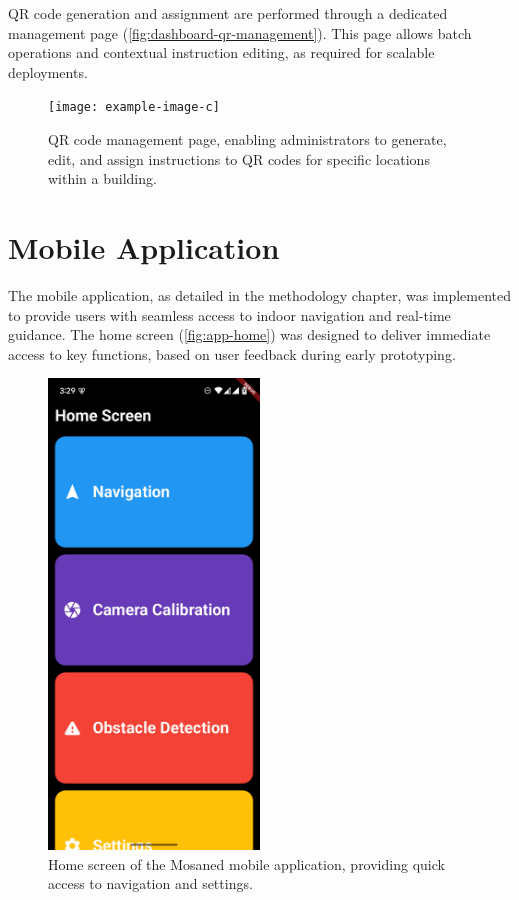 QR code generation and assignment are performed through a dedicated management page (\autoref{fig:dashboard-qr-management}). This page allows batch operations and contextual instruction editing, as required for scalable deployments.
\begin{figure}[h]
	\centering
	\texttt{[image: example-image-c]}
	\caption{QR code management page, enabling administrators to generate, edit, and assign instructions to QR codes for specific locations within a building.}
	\label{fig:dashboard-qr-management}
\end{figure}

\section{Mobile Application}

The mobile application, as detailed in the methodology chapter, was implemented to provide users with seamless access to indoor navigation and real-time guidance. The home screen (\autoref{fig:app-home}) was designed to deliver immediate access to key functions, based on user feedback during early prototyping.
\begin{figure}[h]
	\centering
	\includegraphics[width=0.5\textwidth]{assets/ch5_imp/mobile_app_homescreen.png}
	\caption{Home screen of the Mosaned mobile application, providing quick access to navigation and settings.}
	\label{fig:app-home}
\end{figure}

